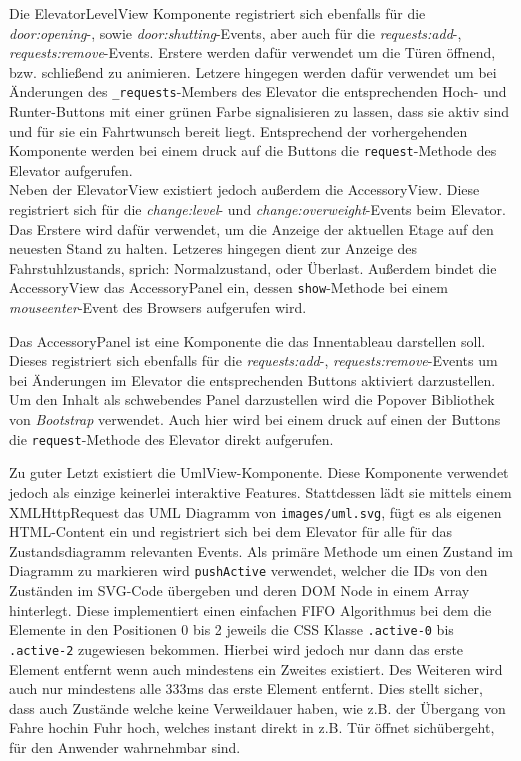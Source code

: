 Die ElevatorLevelView Komponente registriert sich ebenfalls für die \textit{door:opening}-, sowie \textit{door:shutting}-Events, aber auch für die \textit{requests:add}-, \textit{requests:remove}-Events.
Erstere werden dafür verwendet um die Türen öffnend, bzw. schließend zu animieren.
Letzere hingegen werden dafür verwendet um bei Änderungen des \texttt{\_requests}-Members des Elevator die entsprechenden Hoch- und Runter-Buttons mit einer grünen Farbe signalisieren zu lassen, dass sie aktiv sind und für sie ein Fahrtwunsch bereit liegt.
Entsprechend der vorhergehenden Komponente werden bei einem druck auf die Buttons die \texttt{request}-Methode des Elevator aufgerufen. \\

Neben der ElevatorView existiert jedoch außerdem die AccessoryView.
Diese registriert sich für die \textit{change:level}- und \textit{change:overweight}-Events beim Elevator.
Das Erstere wird dafür verwendet, um die Anzeige der aktuellen Etage auf den neuesten Stand zu halten.
Letzeres hingegen dient zur Anzeige des Fahrstuhlzustands, sprich: Normalzustand, oder Überlast.
Außerdem bindet die AccessoryView das AccessoryPanel ein, dessen \texttt{show}-Methode bei einem \textit{mouseenter}-Event des Browsers aufgerufen wird.

Das AccessoryPanel ist eine Komponente die das Innentableau darstellen soll.
Dieses registriert sich ebenfalls für die \textit{requests:add}-, \textit{requests:remove}-Events um bei Änderungen im Elevator die entsprechenden Buttons aktiviert darzustellen.
Um den Inhalt als schwebendes Panel darzustellen wird die Popover Bibliothek von \textit{Bootstrap} verwendet.
Auch hier wird bei einem druck auf einen der Buttons die \texttt{request}-Methode des Elevator direkt aufgerufen.

Zu guter Letzt existiert die UmlView-Komponente.
Diese Komponente verwendet jedoch als einzige keinerlei interaktive Features.
Stattdessen lädt sie mittels einem XMLHttpRequest das UML Diagramm von \texttt{images/uml.svg}, fügt es als eigenen HTML-Content ein und registriert sich bei dem Elevator für alle für das Zustandsdiagramm relevanten Events.
Als primäre Methode um einen Zustand im Diagramm zu markieren wird \texttt{pushActive} verwendet, welcher die IDs von den Zuständen im SVG-Code übergeben und deren DOM Node in einem Array hinterlegt.
Diese implementiert einen einfachen FIFO Algorithmus bei dem die Elemente in den Positionen 0 bis 2 jeweils die CSS Klasse \texttt{.active-0} bis \texttt{.active-2} zugewiesen bekommen.
Hierbei wird jedoch nur dann das erste Element entfernt wenn auch mindestens ein Zweites existiert.
Des Weiteren wird auch nur mindestens alle 333ms das erste Element entfernt.
Dies stellt sicher, dass auch Zustände welche keine Verweildauer haben, wie z.B. der Übergang von \glqq Fahre hoch\grqq in \glqq Fuhr hoch\grqq, welches instant direkt in z.B. \glqq Tür öffnet sich\grqq übergeht, für den Anwender wahrnehmbar sind.

